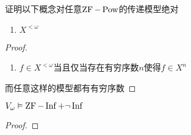 \documentclass[11pt]{article}
\begin{document}
\begin{exercise}[7.10.8]
证明以下概念对任意\(\operatorname{ZF}-\operatorname{Pow}\)的传递模型绝对
\begin{enumerate}
\item \(X^{<\omega}\)
\end{enumerate}
\end{exercise}

\begin{proof}
\begin{enumerate}
\item \(f\in X^{<\omega}\)当且仅当存在有穷序数\(n\)使得\(f\in X^n\)
\end{enumerate}

而任意这样的模型都有有穷序数
\end{proof}

\begin{exercise}[7.10.9]
\(V_\omega\vDash\operatorname{ZF}-\operatorname{Inf}+\neg\operatorname{Inf}\)
\end{exercise}

\begin{proof}

\end{proof}
\end{document}
